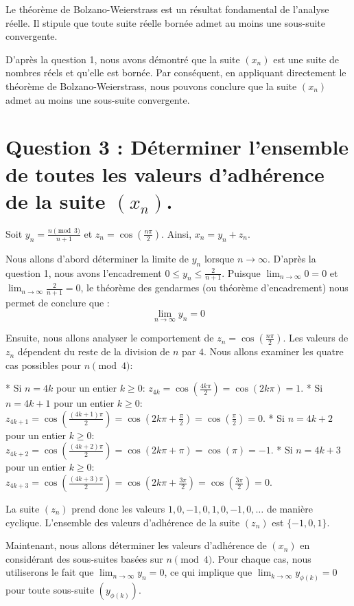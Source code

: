 \documentclass{report}
\begin{document}
Le théorème de Bolzano-Weierstrass est un résultat fondamental de l'analyse réelle. Il stipule que toute suite réelle bornée admet au moins une sous-suite convergente.

D'après la question 1, nous avons démontré que la suite $(x_n)$ est une suite de nombres réels et qu'elle est bornée.
Par conséquent, en appliquant directement le théorème de Bolzano-Weierstrass, nous pouvons conclure que la suite $(x_n)$ admet au moins une sous-suite convergente.

\section*{Question 3 : Déterminer l'ensemble de toutes les valeurs d'adhérence de la suite $(x_n)$.}

Soit $y_n = \frac{n \pmod 3}{n+1}$ et $z_n = \cos\left(\frac{n\pi}{2}\right)$. Ainsi, $x_n = y_n + z_n$.

Nous allons d'abord déterminer la limite de $y_n$ lorsque $n \to \infty$.
D'après la question 1, nous avons l'encadrement $0 \le y_n \le \frac{2}{n+1}$.
Puisque $\lim_{n \to \infty} 0 = 0$ et $\lim_{n \to \infty} \frac{2}{n+1} = 0$, le théorème des gendarmes (ou théorème d'encadrement) nous permet de conclure que :
$$\lim_{n \to \infty} y_n = 0$$

Ensuite, nous allons analyser le comportement de $z_n = \cos\left(\frac{n\pi}{2}\right)$. Les valeurs de $z_n$ dépendent du reste de la division de $n$ par $4$. Nous allons examiner les quatre cas possibles pour $n \pmod 4$:

*   Si $n = 4k$ pour un entier $k \ge 0$:
    $z_{4k} = \cos\left(\frac{4k\pi}{2}\right) = \cos(2k\pi) = 1$.
*   Si $n = 4k+1$ pour un entier $k \ge 0$:
    $z_{4k+1} = \cos\left(\frac{(4k+1)\pi}{2}\right) = \cos\left(2k\pi + \frac{\pi}{2}\right) = \cos\left(\frac{\pi}{2}\right) = 0$.
*   Si $n = 4k+2$ pour un entier $k \ge 0$:
    $z_{4k+2} = \cos\left(\frac{(4k+2)\pi}{2}\right) = \cos(2k\pi + \pi) = \cos(\pi) = -1$.
*   Si $n = 4k+3$ pour un entier $k \ge 0$:
    $z_{4k+3} = \cos\left(\frac{(4k+3)\pi}{2}\right) = \cos\left(2k\pi + \frac{3\pi}{2}\right) = \cos\left(\frac{3\pi}{2}\right) = 0$.

La suite $(z_n)$ prend donc les valeurs $1, 0, -1, 0, 1, 0, -1, 0, \dots$ de manière cyclique. L'ensemble des valeurs d'adhérence de la suite $(z_n)$ est $\{-1, 0, 1\}$.

Maintenant, nous allons déterminer les valeurs d'adhérence de $(x_n)$ en considérant des sous-suites basées sur $n \pmod 4$. Pour chaque cas, nous utiliserons le fait que $\lim_{n \to \infty} y_n = 0$, ce qui implique que $\lim_{k \to \infty} y_{\phi(k)} = 0$ pour toute sous-suite $(y_{\phi(k)})$.
\end{document}
